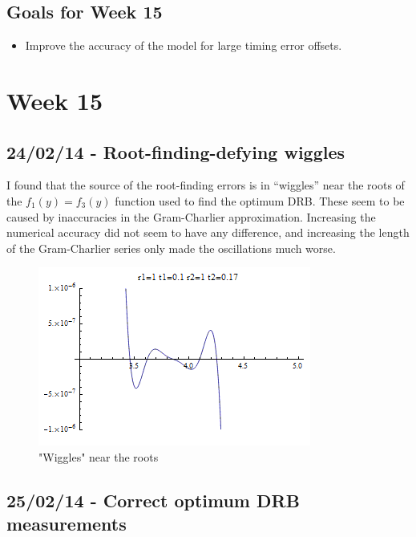 \subsection{Goals for Week 15}

\begin{itemize}
\itemsep1pt\parskip0pt
\item
  Improve the accuracy of the model for large timing error offsets.
\end{itemize}

\section{Week 15}

\subsection{24/02/14 - Root-finding-defying wiggles}

I found that the source of the root-finding errors is in ``wiggles''
near the roots of the $f_1(y)=f_3(y)$ function used to find the optimum
DRB. These seem to be caused by inaccuracies in the Gram-Charlier
approximation. Increasing the numerical accuracy did not seem to have
any difference, and increasing the length of the Gram-Charlier series
only made the oscillations much worse.

\begin{figure}[htbp]
\centering
\includegraphics{../../../plots/rootfindingconfusion_M20_cropped.png}
\caption{"Wiggles" near the roots}
\end{figure}

\subsection{25/02/14 - Correct optimum DRB measurements}

